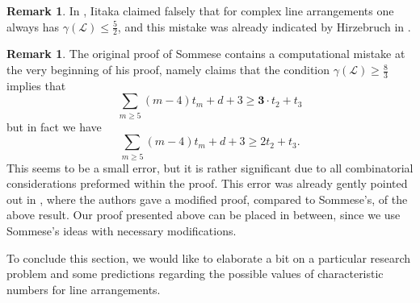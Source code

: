 \documentclass{article}
\theoremstyle{plain}
\theoremstyle{definition}
\newtheorem{remark}[thm]{Remark}
\numberwithin{equation}{section}
\begin{document}
\begin{remark}
In \cite{Iitaka}, Iitaka claimed falsely that for complex line arrangements one always has $\gamma(\mathcal{L}) \leq \frac{5}{2}$, and this mistake was already indicated by Hirzebruch in \cite{Hirzebruch}.
\end{remark}
\begin{remark}
The original proof of Sommese contains a computational mistake at the very beginning of his proof, namely claims that the condition $\gamma(\mathcal{L}) \geq \frac{8}{3}$ implies that
\[\sum_{m\geq 5}(m-4)t_{m} + d + 3\geq \textbf{3}\cdot t_{2}+t_{3}\]
but in fact we have
\[\sum_{m\geq 5}(m-4)t_{m} + d + 3\geq 2t_{2}+t_{3}.\]
This seems to be a small error, but it is rather significant due to all combinatorial considerations preformed within the proof. This error was already gently pointed out in \cite[Kapitel 3.4 I]{BHH87}, where the authors gave a modified proof, compared to Sommese's, of the above result. Our proof presented above can be placed in between, since we use Sommese's ideas with necessary modifications.
\end{remark}
To conclude this section, we would like to elaborate a bit on a particular research problem and some predictions regarding the possible values of characteristic numbers for line arrangements.
\end{document}

